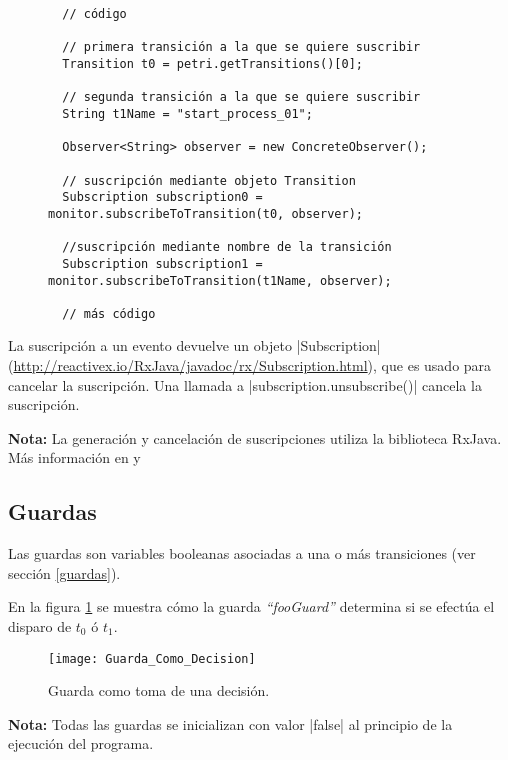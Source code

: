 \begin{figure}[H]
\centering
\begin{verbatim}
  // código
  
  // primera transición a la que se quiere suscribir
  Transition t0 = petri.getTransitions()[0]; 
  
  // segunda transición a la que se quiere suscribir
  String t1Name = "start_process_01";
  
  Observer<String> observer = new ConcreteObserver();
  
  // suscripción mediante objeto Transition
  Subscription subscription0 = monitor.subscribeToTransition(t0, observer);
  
  //suscripción mediante nombre de la transición
  Subscription subscription1 = monitor.subscribeToTransition(t1Name, observer);
  
  // más código
\end{verbatim}
\end{figure}

La suscripción a un evento devuelve un objeto |Subscription|
(\url{http://reactivex.io/RxJava/javadoc/rx/Subscription.html}),
que es usado para cancelar la suscripción.
Una llamada a |subscription.unsubscribe()| cancela la suscripción.

\begin{framed}
\textbf{Nota:} La generación y cancelación de suscripciones utiliza la
biblioteca RxJava. Más información en \cite{RxJava} y \cite{RxJavaJavadoc}
\end{framed}

\subsection{Guardas}
\label{sec:guardas_monitor}
Las guardas son variables booleanas asociadas a una o más transiciones (ver
sección \ref{guardas}).

En la figura \ref{fig:guarda_como_decision} se muestra cómo la guarda
\textit{``fooGuard''} determina si se efectúa el disparo de $t_{0}$ ó $t_{1}$.

\begin{figure}[H]
  \centering
  \texttt{[image: Guarda\_Como\_Decision]}
  \caption{Guarda como toma de una decisión.}
  \label{fig:guarda_como_decision}
\end{figure}

\begin{framed}
\textbf{Nota:} Todas las guardas se inicializan con valor |false| al
principio de la ejecución del programa.
\end{framed}

